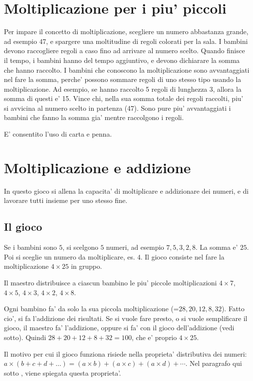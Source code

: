 \documentclass[a4paper]{article}
\begin{document}
\section{Moltiplicazione per i piu' piccoli}

Per impare il concetto di moltiplicazione, scegliere un numero abbastanza grande, ad esempio 47, e spargere una moltitudine di regoli colorati per la sala. I bambini devono raccogliere regoli a caso fino ad arrivare al numero scelto. Quando finisce il tempo, i bambini hanno del tempo aggiuntivo, e devono dichiarare la somma che hanno raccolto. I bambini che conoscono la moltiplicazione sono avvantaggiati nel fare la somma, perche' possono sommare regoli di uno stesso tipo usando la moltiplicazione. Ad esempio, se hanno raccolto 5 regoli di lunghezza 3, allora la somma di questi e' 15. Vince chi, nella sua somma totale dei regoli raccolti, piu' si avvicina al numero scelto in partenza (47). Sono pure piu' avvantaggiati i bambini che fanno la somma gia' mentre raccolgono i regoli.

E' consentito l'uso di carta e penna.


\section{Moltiplicazione e addizione}
In questo gioco si allena la capacita' di moltiplicare e addizionare dei numeri, e di lavorare tutti insieme per uno stesso fine.

\subsection{Il gioco}
Se i bambini sono $5$, si scelgono $5$ numeri, ad esempio $7,5,3,2,8$. La somma e' $25$. Poi si sceglie un numero da moltiplicare, es. $4$. Il gioco consiste nel fare la moltiplicazione $4\times 25$ in gruppo.

Il maestro distribuisce a ciascun bambino le piu' piccole moltiplicazioni $4\times 7$, $4\times 5$, $4\times 3$, $4\times 2$, $4\times 8$.

Ogni bambino fa' da solo la sua piccola moltiplicazione (=$28, 20, 12, 8, 32$). Fatto cio', si fa l'addizione dei risultati. Se si vuole fare presto, o si vuole semplificare il gioco, il maestro fa' l'addizione, oppure si fa' con il gioco dell'addizione (vedi sotto). Quindi $28+20+12+8+32 = 100$, che e' proprio $4\times 25 $.

Il motivo per cui il gioco funziona risiede nella proprieta' distributiva dei numeri: $a \times (b+c+d+\ldots) = (a\times b)+(a\times c)+(a\times d)+\cdots$. Nel paragrafo qui sotto , viene spiegata questa proprieta'.\\
\end{document}
